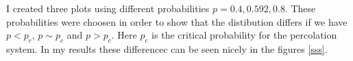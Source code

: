 


I created three plots using different probabilities $p=0.4, 0.592, 0.8$. These probabilities were choosen in order to show that the distibution differs if we have $p<p_c$, $p\sim p_c$ and $p>p_c$. Here $p_c$ is the critical probability for the percolation system. In my results these differencec can be seen nicely in the figures \ref{sss}.
